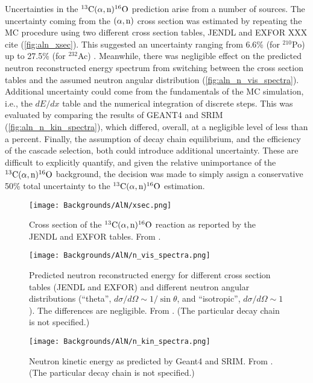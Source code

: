 \documentclass[../thesis.tex]{subfiles}
\begin{document}
Uncertainties in the $^{13}\mathrm{C}(\alpha, \mathrm{n})^{16}\mathrm{O}$ prediction arise from a number of sources. The uncertainty coming from the $(\alpha,\mathrm{n})$ cross section was estimated by repeating the MC procedure using two different cross section tables, JENDL and EXFOR XXX cite (\autoref{fig:aln_xsec}). This suggested an uncertainty ranging from 6.6\% (for $^{210}$Po) up to 27.5\% (for $^{232}$Ac) \cite{Zhao_2014}. Meanwhile, there was negligible effect on the predicted neutron reconstructed energy spectrum from switching between the cross section tables and the assumed neutron angular distribution (\autoref{fig:aln_n_vis_spectra}). Additional uncertainty could come from the fundamentals of the MC simulation, i.e., the $dE/dx$ table and the numerical integration of discrete steps. This was evaluated by comparing the results of GEANT4 and SRIM (\autoref{fig:aln_n_kin_spectra}), which differed, overall, at a negligible level of less than a percent. Finally, the assumption of decay chain equilibrium, and the efficiency of the cascade selection, both could introduce additional uncertainty. These are difficult to explicitly quantify, and given the relative unimportance of the $^{13}\mathrm{C}(\alpha, \mathrm{n})^{16}\mathrm{O}$ background, the decision was made to simply assign a conservative 50\% total uncertainty to the $^{13}\mathrm{C}(\alpha, \mathrm{n})^{16}\mathrm{O}$ estimation.

\begin{figure}[ht]
  \texttt{[image: Backgrounds/AlN/xsec.png]}
  \caption{Cross section of the $^{13}\mathrm{C}(\alpha, \mathrm{n})^{16}\mathrm{O}$ reaction as reported by the JENDL and EXFOR tables. From \cite{Zhao_2014}.}
  \label{fig:aln_xsec}
\end{figure}

\begin{figure}[ht]
  \texttt{[image: Backgrounds/AlN/n\_vis\_spectra.png]}
  \caption{Predicted neutron reconstructed energy for different cross section tables (JENDL and EXFOR) and different neutron angular distributions (``theta'', $d\sigma/d\Omega \sim 1/\sin\theta$, and ``isotropic'', $d\sigma/d\Omega \sim 1$). The differences are negligible. From \cite{Zhao_2014}. (The particular decay chain is not specified.)}
  \label{fig:aln_n_vis_spectra}
\end{figure}

\begin{figure}[ht]
  \texttt{[image: Backgrounds/AlN/n\_kin\_spectra.png]}
  \caption{Neutron kinetic energy as predicted by Geant4 and SRIM. From \cite{Zhao_2014}. (The particular decay chain is not specified.)}
  \label{fig:aln_n_kin_spectra}
\end{figure}
\end{document}
